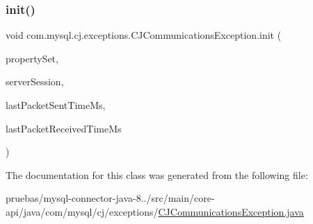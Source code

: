 \subsubsection{\texorpdfstring{init()}{init()}}
{\footnotesize\ttfamily void com.\+mysql.\+cj.\+exceptions.\+C\+J\+Communications\+Exception.\+init (\begin{DoxyParamCaption}\item[{\mbox{\hyperlink{interfacecom_1_1mysql_1_1cj_1_1conf_1_1_property_set}{Property\+Set}}}]{property\+Set,  }\item[{\mbox{\hyperlink{interfacecom_1_1mysql_1_1cj_1_1protocol_1_1_server_session}{Server\+Session}}}]{server\+Session,  }\item[{long}]{last\+Packet\+Sent\+Time\+Ms,  }\item[{long}]{last\+Packet\+Received\+Time\+Ms }\end{DoxyParamCaption})}



The documentation for this class was generated from the following file\+:\begin{DoxyCompactItemize}
\item 
pruebas/mysql-\/connector-\/java-\/8../src/main/core-\/api/java/com/mysql/cj/exceptions/\mbox{\hyperlink{_c_j_communications_exception_8java}{C\+J\+Communications\+Exception.\+java}}\end{DoxyCompactItemize}
